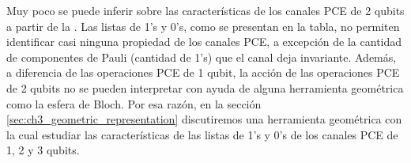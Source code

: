 Muy poco se puede inferir sobre las características de los canales 
PCE de 2 qubits a partir 
de la . Las listas de 1's y 0's, 
como se presentan en la tabla, no permiten identificar casi ninguna 
propiedad de los canales PCE, a excepción de la cantidad de componentes 
de Pauli (cantidad de 1's) que el canal deja invariante. Además, a 
diferencia de las operaciones PCE de 1 qubit, la acción de las operaciones PCE
de 2 qubits no se pueden interpretar con ayuda de alguna herramienta 
geométrica como la esfera de Bloch. Por esa razón, en la sección 
\ref{sec:ch3_geometric_representation} discutiremos una 
herramienta geométrica con la cual estudiar las características de 
las listas de 1's y 0's de los canales PCE de 1, 2 y 3 qubits.
\begin{table}[]
\centering
{}
\end{table}

